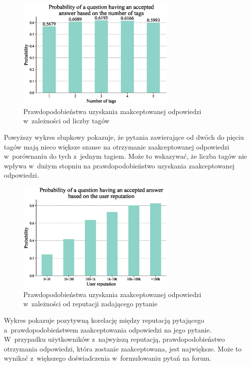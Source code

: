 \documentclass[12pt]{article}
\begin{document}
	\begin{figure}[H]
		\centering
		\includegraphics[width=0.7\textwidth]{tags_number}
		\caption{Prawdopodobieństwa uzyskania zaakceptowanej odpowiedzi w~zależności od liczby tagów}
		\label{fig:prawdopodobienstwa-uzyskania-odpowiedzi-liczba-tagow}
	\end{figure}
	Powyższy wykres słupkowy pokazuje, że pytania zawierające od dwóch do pięciu tagów mają nieco większe szanse na otrzymanie zaakceptowanej odpowiedzi w~porównaniu do tych z~jednym tagiem.
	Może to wskazywać, że liczba tagów nie wpływa w~dużym stopniu na prawdopodobieństwo uzyskania zaakceptowanej odpowiedzi.

	\begin{figure}[H]
		\centering
		\includegraphics[width=0.7\textwidth]{user_reputation}
		\caption{Prawdopodobieństwa uzyskania zaakceptowanej odpowiedzi w~zależności od reputacji zadającego pytanie}
		\label{fig:prawdopodobienstwa-uzyskania-odpowiedzi-reputacja}
	\end{figure}
	Wykres pokazuje pozytywną korelację między reputacją pytającego a~prawdopodobieństwem zaakceptowania odpowiedzi na jego pytanie.
	W~przypadku użytkowników z~najwyższą reputacją, prawdopodobieństwo otrzymania odpowiedzi, która zostanie zaakceptowana, jest największe.
	Może to wynikać z~większego doświadczenia w~formułowaniu pytań na forum.
\end{document}
